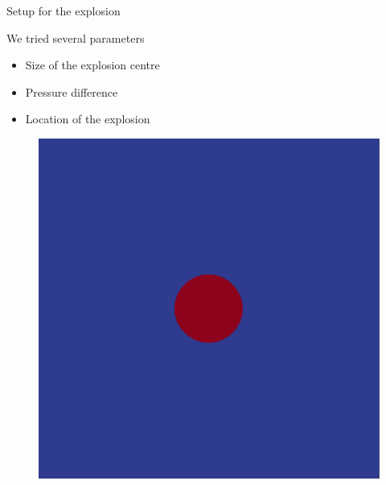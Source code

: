 
\begin{frame}{Setup for the explosion}	

We tried several parameters
\begin{itemize}
\item Size of the explosion centre
\item Pressure difference 
\item Location of the explosion
\end{itemize}
\vspace{1cm}
        	  	\begin{minipage}{0.3\textwidth}
        	  	\begin{block}{}
        	  				\vspace{-1.7cm}
        	  	     	  	\begin{figure}
        	  	     	  	      	  \centering
        	  	     	  	      	  \includegraphics[width=\textwidth]{../../figs/exp/circ}
        	  	     	  	 \end{figure}
        	  	\end{block}
        	  	\end{minipage}
        	  	\begin{minipage}{0.3\textwidth}
        	  			\begin{block}{}
        	  			\vspace{-1.7cm}
        	  				\begin{figure}

\end{figure}
\end{block}
\end{minipage}
\end{frame}
